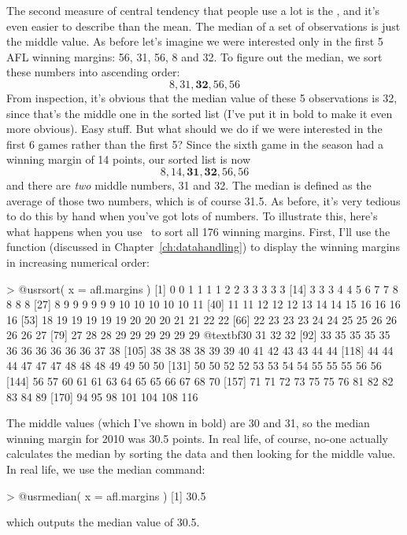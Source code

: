 The second measure of central tendency that people use a lot is the , and it's even easier to describe than the mean. The median of a set of observations is just the middle value. As before let's imagine we were interested only in the first 5 AFL winning margins: 56, 31, 56, 8 and 32. To figure out the median, we sort these numbers into ascending order:
$$
8, 31, \mathbf{32}, 56, 56
$$
From inspection, it's obvious that the median value of these 5 observations is 32, since that's the middle one in the sorted list (I've put it in bold to make it even more obvious). Easy stuff. But what should we do if we were interested in the first 6 games rather than the first 5? Since the sixth game in the season had a winning margin of 14 points, our sorted list is now 
$$
8, 14, \mathbf{31}, \mathbf{32}, 56, 56
$$
and there are {\it two} middle numbers, 31 and 32. The median is defined as the average of those two numbers, which is of course 31.5. As before, it's very tedious to do this by hand when you've got lots of numbers. To illustrate this, here's what happens when you use \R\ to sort all 176 winning margins. First, I'll use the  function (discussed in Chapter~\ref{ch:datahandling}) to display the winning margins in increasing numerical order:
\begin{rblock1}
> @usr{sort( x = afl.margins )}
  [1]   0   0   1   1   1   1   2   2   3   3   3   3   3
 [14]   3   3   3   4   4   5   6   7   7   8   8   8   8
 [27]   8   9   9   9   9   9   9  10  10  10  10  10  11
 [40]  11  11  12  12  12  13  14  14  15  16  16  16  16
 [53]  18  19  19  19  19  19  20  20  20  21  21  22  22
 [66]  22  23  23  23  24  24  25  25  26  26  26  26  27
 [79]  27  28  28  29  29  29  29  29  29  @textbf{30  31}  32  32
 [92]  33  35  35  35  35  36  36  36  36  36  36  37  38
[105]  38  38  38  38  39  39  40  41  42  43  43  44  44
[118]  44  44  44  47  47  47  48  48  48  49  49  50  50
[131]  50  50  52  52  53  53  54  54  55  55  55  56  56
[144]  56  57  60  61  61  63  64  65  65  66  67  68  70
[157]  71  71  72  73  75  75  76  81  82  82  83  84  89
[170]  94  95  98 101 104 108 116
\end{rblock1}
The middle values (which I've shown in bold) are 30 and 31, so the median winning margin for 2010 was 30.5 points. In real life, of course, no-one actually calculates the median by sorting the data and then looking for the middle value. In real life, we use the median command:
\begin{rblock1}
> @usr{median( x = afl.margins )}
[1] 30.5
\end{rblock1}
which outputs the median value of 30.5. 




